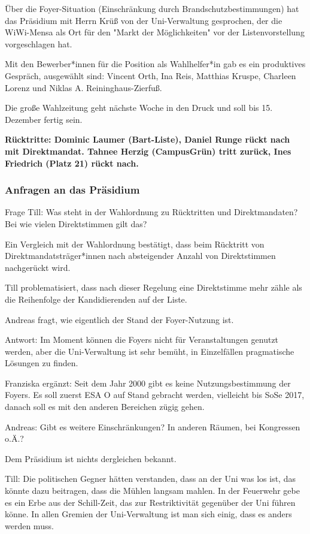 \documentclass[ngerman,headheight=70pt]{scrartcl}
\begin{document}
    Über die Foyer-Situation (Einschränkung durch Brandschutzbestimmungen) hat
    das Präsidium mit Herrn Krüß von der Uni-Verwaltung gesprochen, der die
    WiWi-Mensa als Ort für den "Markt der Möglichkeiten" vor der
    Listenvorstellung vorgeschlagen hat.

    Mit den Bewerber*innen für die Position als Wahlhelfer*in gab es ein
    produktives Gespräch, ausgewählt sind: Vincent Orth, Ina Reis, Matthias
    Kruspe, Charleen Lorenz und Niklas A. Reininghaus-Zierfuß.

    Die große Wahlzeitung geht nächste Woche in den Druck und soll bis 15.
    Dezember fertig sein.

    \textbf{Rücktritte: Dominic Laumer (Bart-Liste), Daniel Runge rückt nach mit
    Direktmandat. Tahnee Herzig (CampusGrün) tritt zurück, Ines Friedrich (Platz
    21) rückt nach.}

    \subsubsection{Anfragen an das Präsidium}

    Frage Till: Was steht in der Wahlordnung zu Rücktritten und Direktmandaten?
    Bei wie vielen Direktstimmen gilt das?

    Ein Vergleich mit der Wahlordnung bestätigt, dass beim Rücktritt von
    Direktmandatsträger*innen nach absteigender Anzahl von Direktstimmen
    nachgerückt wird.

    Till problematisiert, dass nach dieser Regelung eine Direktstimme mehr zähle
    als die Reihenfolge der Kandidierenden auf der Liste.

    Andreas fragt, wie eigentlich der Stand der Foyer-Nutzung ist.

    Antwort: Im Moment können die Foyers nicht für Veranstaltungen genutzt werden,
    aber die Uni-Verwaltung ist sehr bemüht, in Einzelfällen pragmatische
    Lösungen zu finden.

    Franziska ergänzt: Seit dem Jahr 2000 gibt es keine Nutzungsbestimmung der
    Foyers. Es soll zuerst ESA O auf Stand gebracht werden, vielleicht bis SoSe
    2017, danach soll es mit den anderen Bereichen zügig gehen.

    Andreas: Gibt es weitere Einschränkungen? In anderen Räumen, bei Kongressen
    o.Ä.?

    Dem Präsidium ist nichts dergleichen bekannt.

    Till: Die politischen Gegner hätten verstanden, dass an der Uni was los ist,
    das könnte dazu beitragen, dass die Mühlen langsam mahlen. In der Feuerwehr
    gebe es ein Erbe aus der Schill-Zeit, das zur Restriktivität gegenüber der
    Uni führen könne. In allen Gremien der Uni-Verwaltung ist man sich einig,
    dass es anders werden muss.
\end{document}
